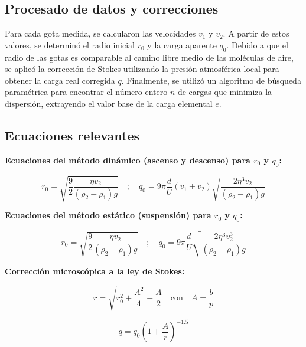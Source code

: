 \documentclass[9pt,a4paper,twocolumn,twoside]{rho-class/rho}
\begin{document}
\subsection{Procesado de datos y correcciones}

Para cada gota medida, se calcularon las velocidades $v_1$ y $v_2$. %
A partir de estos valores, se determinó el radio inicial $r_0$ y la carga aparente $q_0$. %
Debido a que el radio de las gotas es comparable al camino libre medio de las moléculas de aire, se aplicó la corrección de Stokes utilizando la presión atmosférica local para obtener la carga real corregida $q$. %
Finalmente, se utilizó un algoritmo de búsqueda paramétrica para encontrar el número entero $n$ de cargas que minimiza la dispersión, extrayendo el valor base de la carga elemental $e$. %


\subsection{Ecuaciones relevantes}
\textbf{Ecuaciones del método dinámico (ascenso y descenso) para $r_0$ y $q_0$:}

\begin{equation}\label{eq:equation}
    r_0 = \sqrt{\frac{9}{2} \frac{\eta v_2}{(\rho_2 - \rho_1)g}} \quad ; \quad q_0 = 9 \pi \frac{d}{U} (v_1 + v_2) \sqrt{\frac{2 \eta^3 v_2}{(\rho_2 - \rho_1) g}}
\end{equation}
\vspace{0.3cm}

\begin{flushleft}
    \textbf{Ecuaciones del método estático (suspensión) para $r_0$ y $q_0$:}
\end{flushleft}

\begin{equation}\label{eq:suspension}
    r_0 = \sqrt{\frac{9}{2} \frac{\eta v_2}{(\rho_2 - \rho_1)g}} \quad ; \quad q_0 = 9 \pi \frac{d}{U} \sqrt{\frac{2 \eta^3 v_2^3}{(\rho_2 - \rho_1) g}}
\end{equation}

\vspace{0.3cm}
\textbf{Corrección microscópica a la ley de Stokes:}

\begin{equation}
    r = \sqrt{r_0^2 + \frac{A^2}{4}} - \frac{A}{2} \quad \text{con} \quad A = \frac{b}{p}
\end{equation}

\begin{equation}\label{eq:stokes}
    q = q_0 \left(1 + \frac{A}{r}\right)^{-1.5}
\end{equation}
\end{document}

